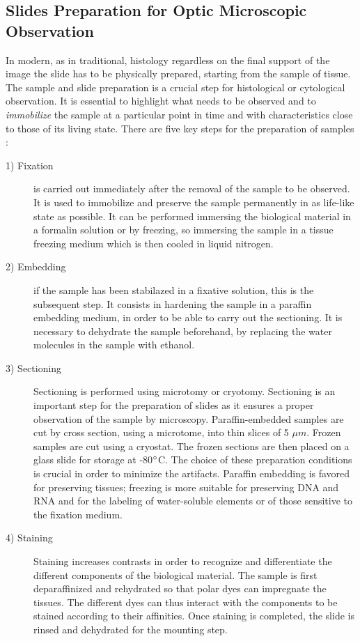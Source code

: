 \subsection{Slides Preparation for Optic Microscopic Observation} \label{ssec:samp_prep}
In modern, as in traditional, histology regardless on the final support of the image the slide has to be physically prepared, starting from the sample of tissue. The sample and slide preparation is a crucial step for histological or cytological observation. It is essential to highlight what needs to be observed and to \textit{immobilize} the sample at a particular point in time and with characteristics close to those of its living state. There are five key steps for the preparation of samples \cite{Alturkistani2015}:
\begin{description}
    \item [1) Fixation] is carried out immediately after the removal of the sample to be observed. It is used to immobilize and preserve the sample permanently in as life-like state as possible. It can be performed immersing the biological material in a formalin solution or by freezing, so immersing the sample in a tissue freezing medium which is then cooled in liquid nitrogen.

    \item [2) Embedding] if the sample has been stabilazed in a fixative solution, this is the subsequent step. It consists in hardening the sample in a paraffin embedding medium, in order to be able to carry out the sectioning. It is necessary to dehydrate the sample beforehand, by replacing the water molecules in the sample with ethanol.

    \item [3) Sectioning] Sectioning is performed using microtomy or cryotomy. Sectioning is an important step for the preparation of slides as it ensures a proper observation of the sample by microscopy. Paraffin-embedded samples are cut by cross section, using a microtome, into thin slices of 5 $\mu m$. Frozen samples are cut using a cryostat. The frozen sections are then placed on a glass slide for storage at -80$\degree$C. The choice of these preparation conditions is crucial in order to minimize the artifacts. Paraffin embedding is favored for preserving tissues; freezing is more suitable for preserving DNA and RNA and for the labeling of water-soluble elements or of those sensitive to the fixation medium.

    \item [4) Staining] Staining increases contrasts in order to recognize and differentiate the different components of the biological material. The sample is first deparaffinized and rehydrated so that polar dyes can impregnate the tissues. The different dyes can thus interact with the components to be stained according to their affinities. Once staining is completed, the slide is rinsed and dehydrated for the mounting step.

\end{description}

